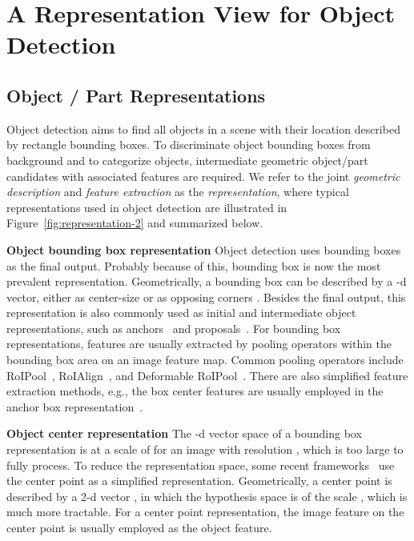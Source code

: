 \documentclass{article}
\begin{document}
\vspace{-.5em}

\section{A Representation View for Object Detection}
\subsection{Object / Part Representations}

Object detection aims to find all objects in a scene with their location described by rectangle bounding boxes. To discriminate object bounding boxes from background and to categorize objects, intermediate geometric object/part candidates with associated features are required. We refer to the joint \emph{geometric description} and \emph{feature extraction} as the \emph{representation}, where typical representations used in object detection are illustrated in Figure~\ref{fig:representation-2} and summarized below.

{\noindent \textbf{Object bounding box representation}} \hspace{3pt} Object detection uses bounding boxes as the final output. Probably because of this, bounding box is now the most prevalent representation. Geometrically, a bounding box can be described by a -d vector, either as center-size  or as opposing corners . Besides the final output, this representation is also commonly used as initial and intermediate object representations, such as anchors~\cite{ren2015faster,SSD,YOLOv2,YOLOv3,RetinaNet} and proposals~\cite{girshick2014rich,dai2016r,FPN,Mask-rcnn}. For bounding box representations, features are usually extracted by pooling operators within the bounding box area on an image feature map. Common pooling operators include RoIPool~\cite{girshick2015fast}, RoIAlign~\cite{Mask-rcnn}, and Deformable RoIPool~\cite{DCN,DCNv2}. There are also simplified feature extraction methods, e.g., the box center features are usually employed in the anchor box representation~\cite{ren2015faster,RetinaNet}.

{\noindent \textbf{Object center representation}}\hspace{3pt} The -d vector space of a bounding box representation is at a scale of  for an image with resolution , which is too large to fully process. To reduce the representation space, some recent frameworks~\cite{FCOS,RepPoints,CenterNet,DBLP:journals/corr/abs-1904-03797,GuidedAnchoring} use the center point as a simplified representation. Geometrically, a center point is described by a 2-d vector , in which the hypothesis space is of the scale , which is much more tractable. For a center point representation, the image feature on the center point is usually employed as the object feature.
\end{document}
